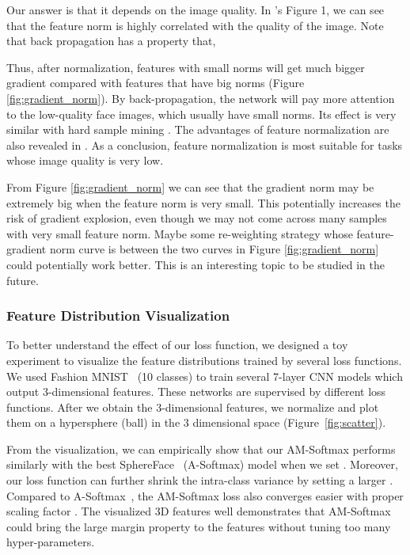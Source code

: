 \documentclass[10pt,twocolumn,letterpaper]{article}
\begin{document}
Our answer is that it depends on the image quality. In \cite{ranjan2017l2}'s Figure 1, we can see that the feature norm is highly correlated with the quality of the image.
Note that back propagation has a property that,

Thus, after normalization, features with small norms will get much bigger gradient compared with features that have big norms (Figure \ref{fig:gradient_norm}). By back-propagation, the network will pay more attention to the low-quality face images, which usually have small norms. Its effect is very similar with hard sample mining  \cite{schroff2015facenet,lin2017focal}. The advantages of feature normalization are also revealed in \cite{liu2017spherenet}. As a conclusion, feature normalization is most suitable for tasks whose image quality is very low.

From Figure \ref{fig:gradient_norm} we can see that the gradient norm may be extremely big when the feature norm is very small. This potentially increases the risk of gradient explosion, even though we may not come across many samples with very small feature norm. Maybe some re-weighting strategy whose feature-gradient norm curve is between the two curves in Figure \ref{fig:gradient_norm} could potentially work better. This is an interesting topic to be studied in the future.

\subsubsection{Feature Distribution Visualization}

To better understand the effect of our loss function, we designed a toy experiment to visualize the feature distributions trained by several loss functions. We used Fashion MNIST~\cite{xiao2017fashion} (10 classes) to train several 7-layer CNN models which output 3-dimensional features. These networks are supervised by different loss functions. After we obtain the 3-dimensional features, we normalize and plot them on a hypersphere (ball) in the 3 dimensional space (Figure~\ref{fig:scatter}). 

From the visualization, we can empirically show that our AM-Softmax performs similarly with the best SphereFace~\cite{liu2017sphereface} (A-Softmax) model when we set . Moreover, our loss function can further shrink the intra-class variance by setting a larger . Compared to A-Softmax~\cite{liu2017sphereface}, the AM-Softmax loss also converges easier with proper scaling factor . The visualized 3D features well demonstrates that AM-Softmax could bring the large margin property to the features without tuning too many hyper-parameters.
\end{document}
